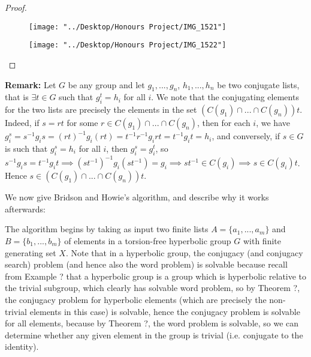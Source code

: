 \documentclass[12pt]{article}
\newcommand{\vs}{\vskip10pt}
\begin{document}
\begin{proof}
\begin{figure} [h]
	\centering
	\texttt{[image: "../Desktop/Honours Project/IMG\_1521"]}
	\caption{}
	\label{fig:img1521}
\end{figure}

\begin{figure} [h]
	\centering
	\texttt{[image: "../Desktop/Honours Project/IMG\_1522"]}
	\caption{}
	\label{fig:img1522}
\end{figure}

		
		
	\end{proof}
	
	\textbf{Remark: } Let $G$ be any group and let $g_1,...,g_n$, $h_1,...,h_n$ be two conjugate lists, that is $\exists t \in G$ such that $g_i^t = h_i$ for all $i$. We note that the conjugating elements for the two lists are precisely the elements in the set $(C(g_1) \cap ... \cap C(g_n))t$. Indeed, if $s = rt$ for some $r \in C(g_1) \cap ... \cap C(g_n)$, then for each $i$, we have $g_i^s = s^{-1} g_i s = (rt)^{-1} g_i (rt) = t^{-1} r^{-1} g_i r t = t^{-1} g_i t = h_i$, and conversely, if $s \in G$ is such that $g_i^s = h_i$ for all $i$, then $g_i^s = g_i^t$, so $s^{-1} g_i s = t^{-1} g_i t \implies (st^{-1})^{-1} g_i (st^{-1}) = g_i \implies st^{-1} \in C(g_i) \implies s \in C(g_i)t$. Hence $s \in (C(g_1) \cap ... \cap C(g_n))t$. 
	
	\vs 
	
	We now give Bridson and Howie's algorithm, and describe why it works afterwards: 
	
	\vs 
	
	The algorithm begins by taking as input two finite lists $A = \{a_1,...,a_m\}$ and $B = \{b_1,...,b_m\}$ of elements in a torsion-free hyperbolic group $G$ with finite generating set $X$. Note that in a hyperbolic group, the conjugacy (and conjugacy search) problem (and hence also the word problem) is solvable because recall from Example ? that a hyperbolic group is a group which is hyperbolic relative to the trivial subgroup, which clearly has solvable word problem, so by Theorem ?, the conjugacy problem for hyperbolic elements (which are precisely the non-trivial elements in this case) is solvable, hence the conjugacy problem is solvable for all elements, because by Theorem ?, the word problem is solvable, so we can determine whether any given element in the group is trivial (i.e. conjugate to the identity).  
	
	\vs 
	
\end{document}
